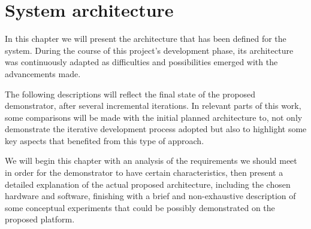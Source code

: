 \chapter{System architecture} \label{chap:sys-arch}

In this chapter we will present the architecture that has been defined for the system.
During the course of this project's development phase, its architecture was continuously adapted as difficulties and possibilities emerged with the advancements made.

The following descriptions will reflect the final state of the proposed demonstrator, after several incremental iterations.
In relevant parts of this work, some comparisons will be made with the initial planned architecture to, not only demonstrate the iterative development process adopted but also to highlight some key aspects that benefited from this type of approach.

We will begin this chapter with an analysis of the requirements we should meet in order for the demonstrator to have certain characteristics, then present a detailed explanation of the actual proposed architecture, including the chosen hardware and software, finishing with a brief and non-exhaustive description of some conceptual experiments that could be possibly demonstrated on the proposed platform.








